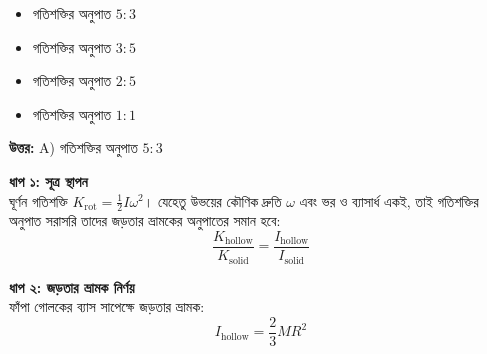 \documentclass[12pt, a4paper]{article}
\begin{document}
{\begin{center}
\end{center}
\vspace{1em}

\begin{itemize}[label={}, leftmargin=1cm, itemsep=0.5em]
    \item[\textbf{A)}] গতিশক্তির অনুপাত $5 : 3$
    \item[\textbf{B)}] গতিশক্তির অনুপাত $3 : 5$
    \item[\textbf{C)}] গতিশক্তির অনুপাত $2 : 5$
    \item[\textbf{D)}] গতিশক্তির অনুপাত $1 : 1$
\end{itemize}

\vspace{0.5em}
\begin{tcolorbox}[answerbox]
    \textbf{\color{success} উত্তর:} A) গতিশক্তির অনুপাত $5 : 3$
\end{tcolorbox}
\vspace{1em}

\begin{tcolorbox}[solutionbox={সমাধান (Solution)}]
    \noindent
    \textbf{ধাপ ১: সূত্র স্থাপন} \\
    ঘূর্ণন গতিশক্তি $K_{\text{rot}} = \frac{1}{2} I \omega^2$। যেহেতু উভয়ের কৌণিক দ্রুতি $\omega$ এবং ভর ও ব্যাসার্ধ একই, তাই গতিশক্তির অনুপাত সরাসরি তাদের জড়তার ভ্রামকের অনুপাতের সমান হবে:
    \[ \frac{K_{\text{hollow}}}{K_{\text{solid}}} = \frac{I_{\text{hollow}}}{I_{\text{solid}}} \]
    
    \vspace{0.5em}
    \noindent\textbf{ধাপ ২: জড়তার ভ্রামক নির্ণয়} \\
    ফাঁপা গোলকের ব্যাস সাপেক্ষে জড়তার ভ্রামক:
    \[ I_{\text{hollow}} = \frac{2}{3} M R^2 \]
    

\end{tcolorbox}}
\end{document}
